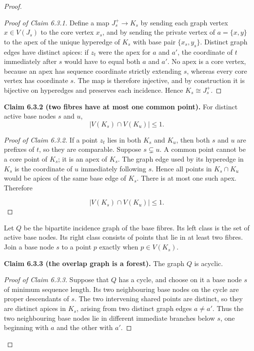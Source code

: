 \documentclass[a4paper,11pt,reqno]{amsart}
\theoremstyle{plain}
\theoremstyle{definition}
\theoremstyle{remark}
\begin{document}
\begin{proof}
\begin{proof}[Proof of Claim 6.3.1]
Define a map \(J_s^+\to K_s\) by sending each graph vertex \(x\in V(J_s)\)
to the core vertex \(x_s\), and by sending the private vertex of
\(a=\{x,y\}\) to the apex of the unique hyperedge of \(K_s\) with base pair
\(\{x_s,y_s\}\). Distinct graph edges have distinct apices: if \(z_t\)
were the apex for \(a\) and \(a'\), the coordinate of \(t\) immediately
after \(s\) would have to equal both \(a\) and \(a'\). No apex is a core
vertex, because an apex has sequence coordinate strictly extending \(s\),
whereas every core vertex has coordinate \(s\). The map is therefore
injective, and by construction it is bijective on hyperedges and preserves
each incidence. Hence \(K_s\cong J_s^+\).
\end{proof}

\medskip
\noindent\textbf{Claim 6.3.2 (two fibres have at most one common point).}
For distinct active base nodes \(s\) and \(u\),
\[
|V(K_s)\cap V(K_u)|\le 1.
\]

\smallskip
\begin{proof}[Proof of Claim 6.3.2]
If a point \(z_t\) lies in both \(K_s\) and \(K_u\), then both \(s\) and
\(u\) are prefixes of \(t\), so they are comparable. Suppose
\(s\subsetneq u\). A common point cannot be a core point of \(K_s\); it is
an apex of \(K_s\). The graph edge used by its hyperedge in \(K_s\) is the
coordinate of \(u\) immediately following \(s\). Hence all points in
\(K_s\cap K_u\) would be apices of the same base edge of \(K_s\). There is
at most one such apex. Therefore

\[
|V(K_s)\cap V(K_u)|\le1. \tag{6.2}
\]
\end{proof}

Let \(Q\) be the bipartite incidence graph of the base fibres. Its left
class is the set of active base nodes. Its right class consists of points
that lie in at least two fibres. Join a base node \(s\) to a point \(p\)
exactly when \(p\in V(K_s)\).

\medskip
\noindent\textbf{Claim 6.3.3 (the overlap graph is a forest).}
The graph \(Q\) is acyclic.

\smallskip
\begin{proof}[Proof of Claim 6.3.3]
Suppose that \(Q\) has a cycle, and choose on it a base node \(s\) of
minimum sequence length. Its two neighbouring base nodes on the cycle are
proper descendants of \(s\). The two intervening shared points are distinct,
so they are distinct apices in \(K_s\), arising from two distinct graph edges
\(a\ne a'\). Thus the two neighbouring base nodes lie in different immediate
branches below \(s\), one beginning with \(a\) and the other with \(a'\).


\end{proof}
\end{proof}
\end{document}
